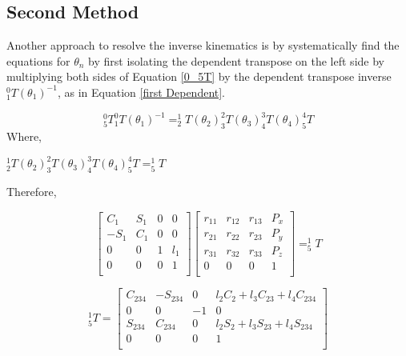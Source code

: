 \documentclass[transmag]{IEEEtran}
\begin{document}
\clearpage
\newpage

\subsection{Second Method}

Another approach to resolve the inverse kinematics is by systematically find the equations for $\theta_n$ by first isolating the dependent transpose on the left side by multiplying both sides of Equation \ref{0_5T} by the dependent transpose inverse $^0_1T(\theta_1)^{-1}$, as in Equation \ref{first Dependent}.

\begin{eqfloat}
\begin{equation}
^0_5T ^0_1T(\theta_1)^{-1} =^1_2T(\theta_2)  ^2_3T(\theta_3)  ^3_4T(\theta_4)  ^4_5T 
\label{first Dependent}
\end{equation}
Where,
\begin{center}
$^1_2T(\theta_2)  ^2_3T(\theta_3)  ^3_4T(\theta_4)  ^4_5T = ^1_5T$
\end{center}
Therefore,


\begin{equation}
\begin{bmatrix}
C_1 & S_1 & 0 & 0   \\
-S_1  & C_1   & 0 & 0   \\
0           & 0            & 1 & l_1 \\
0           & 0            & 0 & 1   \\
\end{bmatrix}
\begin{bmatrix}
r_{11} & r_{12} & r_{13} & P_x   \\
r_{21} & r_{22} & r_{23} & P_y   \\
r_{31} & r_{32} & r_{33} & P_z   \\
0      & 0      & 0      & 1     \\
\end{bmatrix}
=
^1_5T
\end{equation}
\end{eqfloat}


\begin{equation}
^1_5T =
\begin{bmatrix}
C_{234} & -S_{234} & 0 & l_2 C_2 + l_3 C_{23} + l_4 C_{234} \\
0& 0 & -1 & 0 \\
S_{234} & C_{234} & 0 & l_2 S_2 + l_3 S_{23} + l_4 S_{234}  \\

0      & 0      & 0      & 1     \\
\end{bmatrix}
\end{equation}
\end{document}
